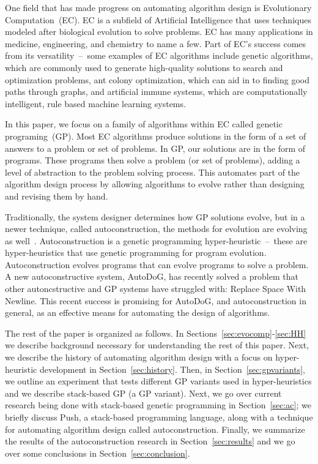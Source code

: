 \documentclass{sig-alternate}
\begin{document}
One field that has made progress on automating algorithm design is Evolutionary Computation~(EC). EC is a subfield of Artificial Intelligence that uses techniques modeled after biological evolution to solve problems. EC has many applications in medicine, engineering, and chemistry to name a few. Part of EC's success comes from its versatility~--~some examples of EC algorithms include genetic algorithms, which are commonly used to generate high-quality solutions to search and optimization problems, ant colony optimization, which can aid in to finding good paths through graphs, and artificial immune systems, which are computationally intelligent, rule based machine learning systems.

In this paper, we focus on a family of algorithms within EC called genetic programing~(GP). Most EC algorithms produce solutions in the form of a set of answers to a problem or set of problems. In GP, our solutions are in the form of programs. These programs then solve a problem (or set of problems), adding a level of abstraction to the problem solving process. This automates part of the algorithm design process by allowing algorithms to evolve rather than designing and revising them by hand.

Traditionally, the system designer determines how GP solutions evolve, but in a newer technique, called autoconstruction, the methods for evolution are evolving as well~\cite{spector:2016}. Autoconstruction is a genetic programming hyper-heuristic~--~these are hyper-heuristics that use genetic programming for program evolution. Autoconstruction evolves programs that can evolve programs to solve a problem. A new autoconstructive system, AutoDoG, has recently solved a problem that other autoncstructive and GP systems have struggled with: Replace Space With Newline. This recent success is promising for AutoDoG, and autoconstruction in general, as an effective means for automating the design of algorithms.

The rest of the paper is organized as follows. In Sections~\ref{sec:evocomp}-\ref{sec:HH} we describe background necessary for understanding the rest of this paper. Next, we describe the history of automating algorithm design with a focus on hyper-heuristic development in Section~\ref{sec:history}. Then, in Section~\ref{sec:gpvariants}, we outline an experiment that tests different GP variants used in hyper-heuristics and we describe stack-based GP (a GP variant). Next, we go over current research being done with stack-based genetic programming in Section~\ref{sec:ac}; we briefly discuss Push, a stack-based programming language, along with a technique for automating algorithm design called autoconstruction. Finally, we summarize the results of the autoconstruction research in Section~\ref{sec:results} and we go over some conclusions in Section~\ref{sec:conclusion}.
\end{document}
